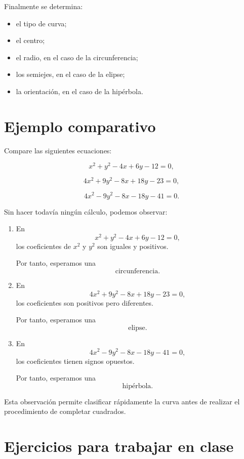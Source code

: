 \documentclass[12pt]{article}
\begin{document}
{Finalmente se determina:

\begin{itemize}
    \item el tipo de curva;
    \item el centro;
    \item el radio, en el caso de la circunferencia;
    \item los semiejes, en el caso de la elipse;
    \item la orientación, en el caso de la hipérbola.
\end{itemize}

\section{Ejemplo comparativo}

Compare las siguientes ecuaciones:

\[
x^2+y^2-4x+6y-12=0,
\]

\[
4x^2+9y^2-8x+18y-23=0,
\]

\[
4x^2-9y^2-8x-18y-41=0.
\]

Sin hacer todavía ningún cálculo, podemos observar:

\begin{enumerate}

\item En
\[
x^2+y^2-4x+6y-12=0,
\]
los coeficientes de \(x^2\) y \(y^2\) son iguales y positivos.

Por tanto, esperamos una
\[
\boxed{\text{circunferencia}.}
\]

\item En
\[
4x^2+9y^2-8x+18y-23=0,
\]
los coeficientes son positivos pero diferentes.

Por tanto, esperamos una
\[
\boxed{\text{elipse}.}
\]

\item En
\[
4x^2-9y^2-8x-18y-41=0,
\]
los coeficientes tienen signos opuestos.

Por tanto, esperamos una
\[
\boxed{\text{hipérbola}.}
\]

\end{enumerate}

Esta observación permite clasificar rápidamente la curva antes de
realizar el procedimiento de completar cuadrados.

\section{Ejercicios para trabajar en clase}

}
\end{document}
